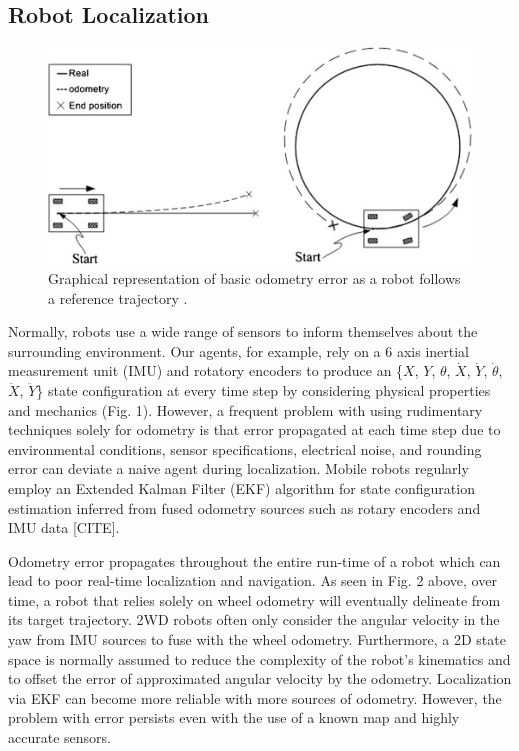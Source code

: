 \documentclass[conference]{IEEEtran}
\begin{document}
\subsection{Robot Localization}
\begin{figure}
	\includegraphics[width=\linewidth]{odometry_error.jpg}
	\caption{Graphical representation of basic odometry error as a robot follows a reference trajectory \cite{RN206}.}
\end{figure}
Normally, robots use a wide range of sensors to inform themselves about the surrounding environment. Our agents, for example, rely on a 6 axis inertial measurement unit (IMU) and rotatory encoders to produce an \{$X$, $Y$, $\theta$, $\dot{X}$, $\dot{Y}$, $\dot{\theta}$, $\ddot{X}$, $\ddot{Y}$\} state configuration at every time step by considering physical properties and mechanics (Fig. 1). However, a frequent problem with using rudimentary techniques solely for odometry is that error propagated at each time step due to environmental conditions, sensor specifications, electrical noise, and rounding error can deviate a naive agent during localization. Mobile robots regularly employ an Extended Kalman Filter (EKF) algorithm for state configuration estimation inferred from fused odometry sources such as rotary encoders and IMU data [CITE].

Odometry error propagates throughout the entire run-time of a robot which can lead to poor real-time localization and navigation. As seen in Fig. 2 above, over time, a robot that relies solely on wheel odometry will eventually delineate from its target trajectory. 2WD robots often only consider the angular velocity in the yaw from IMU sources to fuse with the wheel odometry. Furthermore, a 2D state space is normally assumed to reduce the complexity of the robot's kinematics and to offset the error of approximated angular velocity by the odometry. Localization via EKF can become more reliable with more sources of odometry. However, the problem with error persists even with the use of a known map and highly accurate sensors.
\end{document}
